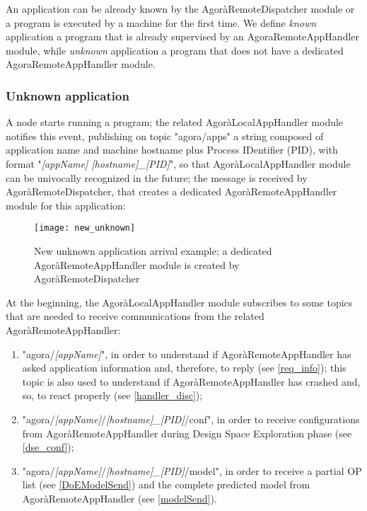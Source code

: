 An application can be already known by the Agorà\-Remote\-Dis\-patch\-er module or a program is executed by a machine for the first time. We define \textit{known} application a program that is already supervised by an AgoraRemoteAppHandler module, while \textit{unknown} application a program that does not have a dedicated AgoraRemoteAppHandler module.

\subsubsection{Unknown application}

A node starts running a program; the related AgoràLocalAppHandler module notifies this event, publishing on topic "agora\slash{}apps" a string composed of application name and machine hostname plus Process IDentifier (PID), with format "\textit{[appName] [hostname]\_[PID]}", so that AgoràLocalAppHandler module can be univocally recognized in the future; the message is received by Agorà\-Remote\-Dispatcher, that creates a dedicated AgoràRemoteAppHandler module for this application:

\begin{figure}[H]

    \centering
    \texttt{[image: new\_unknown]}
    \caption[New unknown application arrival example]{New unknown application arrival example; a dedicated AgoràRemoteAppHandler module is created by AgoràRemoteDispatcher}
    
\end{figure}

At the beginning, the AgoràLocalAppHandler module subscribes to some topics that are needed to receive communications from the related AgoràRemoteAppHandler:

\begin{enumerate}

    \item "agora/\textit{[appName]}", in order to understand if AgoràRemoteAppHandler has asked application information and, therefore, to reply (see \ref{req_info}); this topic is also used to understand if Agorà\-Remote\-App\-Handler has crashed and, so, to react properly (see \ref{handler_disc});
    
    \item "agora/\textit{[appName]}/\textit{[hostname]\_[PID]}/conf", in order to receive configurations from AgoràRemoteAppHandler during Design Space Exploration phase (see \ref{dse_conf});
    
    \item "agora/\textit{[appName]}/\textit{[hostname]\_[PID]}/model", in order to receive a partial OP list (see \ref{DoEModelSend}) and the complete predicted model from AgoràRemoteAppHandler (see \ref{modelSend}).

\end{enumerate}

